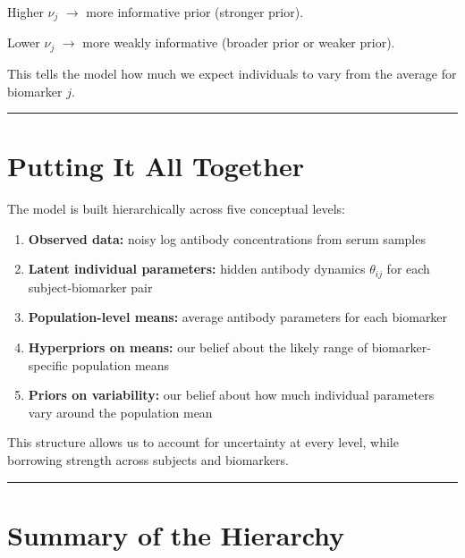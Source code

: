 \documentclass[
]{article}
\providecommand{\tightlist}{%
  \setlength{\itemsep}{0pt}\setlength{\parskip}{0pt}}\usepackage{longtable,booktabs,array}
\begin{document}
Higher \(\nu_j\) \(\rightarrow\) more informative prior (stronger
prior).

Lower \(\nu_j\) \(\rightarrow\) more weakly informative (broader prior
or weaker prior).

This tells the model how much we expect individuals to vary from the
average for biomarker \(j\).

\begin{center}\rule{0.5\linewidth}{0.5pt}\end{center}

\section{Putting It All Together}\label{putting-it-all-together}

The model is built hierarchically across five conceptual levels:

\begin{enumerate}
\def\labelenumi{\arabic{enumi}.}
\tightlist
\item
  \textbf{Observed data:} noisy log antibody concentrations from serum
  samples
\item
  \textbf{Latent individual parameters:} hidden antibody dynamics
  \(\theta_{ij}\) for each subject-biomarker pair
\item
  \textbf{Population-level means:} average antibody parameters for each
  biomarker
\item
  \textbf{Hyperpriors on means:} our belief about the likely range of
  biomarker-specific population means
\item
  \textbf{Priors on variability:} our belief about how much individual
  parameters vary around the population mean
\end{enumerate}

This structure allows us to account for uncertainty at every level,
while borrowing strength across subjects and biomarkers.

\begin{center}\rule{0.5\linewidth}{0.5pt}\end{center}

\section{Summary of the Hierarchy}\label{summary-of-the-hierarchy}
\end{document}
